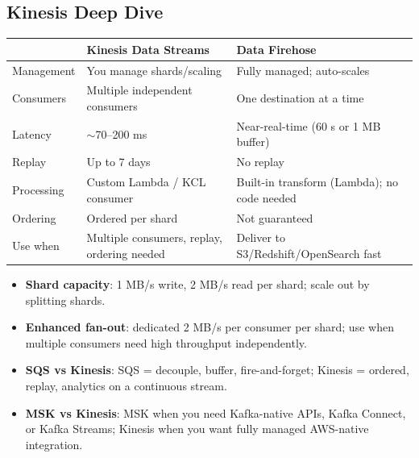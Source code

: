 \subsection{Kinesis Deep Dive}

\begin{comparebox}[title={Kinesis Data Streams vs Data Firehose}]
\begin{tabular}{@{}p{3.5cm}p{4cm}p{4cm}@{}}
\toprule
 & \textbf{Kinesis Data Streams} & \textbf{Data Firehose} \\
\midrule
Management  & You manage shards/scaling          & Fully managed; auto-scales \\
Consumers   & Multiple independent consumers     & One destination at a time \\
Latency     & $\sim$70--200 ms                   & Near-real-time (60 s or 1 MB buffer) \\
Replay      & Up to 7 days                       & No replay \\
Processing  & Custom Lambda / KCL consumer       & Built-in transform (Lambda); no code needed \\
Ordering    & Ordered per shard                  & Not guaranteed \\
Use when    & Multiple consumers, replay, ordering needed & Deliver to S3/Redshift/OpenSearch fast \\
\bottomrule
\end{tabular}
\end{comparebox}

\begin{keyfacts}
\begin{itemize}
  \item \textbf{Shard capacity}: 1 MB/s write, 2 MB/s read per shard;
        scale out by splitting shards.
  \item \textbf{Enhanced fan-out}: dedicated 2 MB/s per consumer per shard;
        use when multiple consumers need high throughput independently.
  \item \textbf{SQS vs Kinesis}: SQS = decouple, buffer, fire-and-forget;
        Kinesis = ordered, replay, analytics on a continuous stream.
  \item \textbf{MSK vs Kinesis}: MSK when you need Kafka-native APIs,
        Kafka Connect, or Kafka Streams; Kinesis when you want fully managed
        AWS-native integration.
\end{itemize}
\end{keyfacts}

